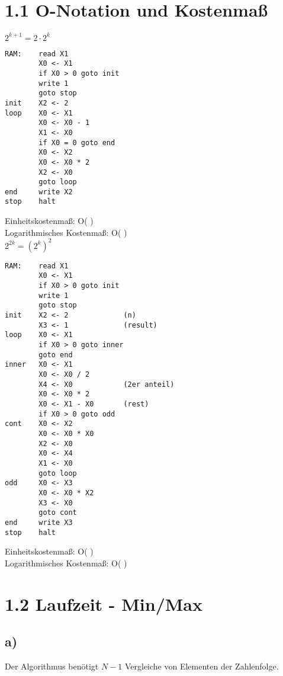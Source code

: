 

\section*{1.1 O-Notation und Kostenmaß}

\textbf{$2^{k+1} = 2 \cdot 2^k$}

\begin{lstlisting}
RAM:    read X1
        X0 <- X1
        if X0 > 0 goto init
        write 1
        goto stop
init    X2 <- 2
loop    X0 <- X1
        X0 <- X0 - 1
        X1 <- X0
        if X0 = 0 goto end
        X0 <- X2
        X0 <- X0 * 2
        X2 <- X0
        goto loop
end     write X2
stop    halt    
\end{lstlisting}
\noindent
Einheitskostenmaß: O( ) \\
Logarithmisches Kostenmaß: O( )\\

\noindent
\textbf{$2^{2k} = (2^k)^2$}
\begin{lstlisting}
RAM:    read X1
        X0 <- X1
        if X0 > 0 goto init
        write 1
        goto stop
init    X2 <- 2             (n)
        X3 <- 1             (result)
loop    X0 <- X1
        if X0 > 0 goto inner
        goto end
inner   X0 <- X1
        X0 <- X0 / 2        
        X4 <- X0            (2er anteil)
        X0 <- X0 * 2
        X0 <- X1 - X0       (rest)
        if X0 > 0 goto odd
cont    X0 <- X2
        X0 <- X0 * X0
        X2 <- X0
        X0 <- X4
        X1 <- X0
        goto loop
odd     X0 <- X3
        X0 <- X0 * X2
        X3 <- X0
        goto cont
end     write X3
stop    halt    
\end{lstlisting}

\noindent
Einheitskostenmaß: O( ) \\
Logarithmisches Kostenmaß: O( )\\

\section*{1.2 Laufzeit - Min/Max}
\subsection*{a)}
Der Algorithmus benötigt $N - 1$ Vergleiche von Elementen der Zahlenfolge.
